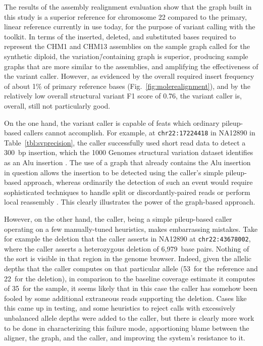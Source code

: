 The results of the assembly realignment evaluation show that the graph built in this study is a superior reference for chromosome 22 compared to the primary, linear reference currently in use today, for the purpose of variant calling with the \vg toolkit. In terms of the inserted, deleted, and substituted bases required to represent the CHM1 and CHM13 assemblies on the sample graph called for the synthetic diploid, the variation\=/containing graph is superior, producing sample graphs that are more similar to the assemblies, and amplifying the effectiveness of the variant caller. However, as evidenced by the overall required insert frequency of about 1\% of primary reference bases (Fig.~\ref{fig:molerealignment}), and by the relatively low overall structural variant F1 score of 0.76, the \vg variant caller is, overall, still not particularly good.

On the one hand, the \vg variant caller is capable of feats which ordinary pileup-based callers cannot accomplish. For example, at \texttt{chr22:17224418} in NA12890 in Table~\ref{tbl:svprecision}, the \vg caller successfully used short read data to detect a 300~bp insertion, which the 1000 Genomes structural variation dataset identifies as an Alu insertion \cite{sudmant2015integrated}. The use of a graph that already contains the Alu insertion in question allows the insertion to be detected using the \vg caller's simple pileup-based approach, whereas ordinarily the detection of such an event would require sophisticated techniques to handle split or discordantly-paired reads or perform local reassembly \cite{wildschutte2015discovery}. This clearly illustrates the power of the graph-based approach.



However, on the other hand, the \vg caller, being a simple pileup-based caller operating on a few manually-tuned heuristics, makes embarrassing mistakes. Take for example the deletion that the caller asserts in NA12890 at \texttt{chr22:43678002}, where the caller asserts a heterozygous deletion of 6,979~base pairs. Nothing of the sort is visible in that region in the genome browser. Indeed, given the allelic depths that the caller computes on that particular allele (53~for the reference and 22~for the deletion), in comparison to the baseline coverage estimate it computes of 35~for the sample, it seems likely that in this case the caller has somehow been fooled by some additional extraneous reads supporting the deletion. Cases like this came up in testing, and some heuristics to reject calls with excessively unbalanced allele depths were added to the caller, but there is clearly more work to be done in characterizing this failure mode, apportioning blame between the aligner, the graph, and the caller, and improving the system's resistance to it.

